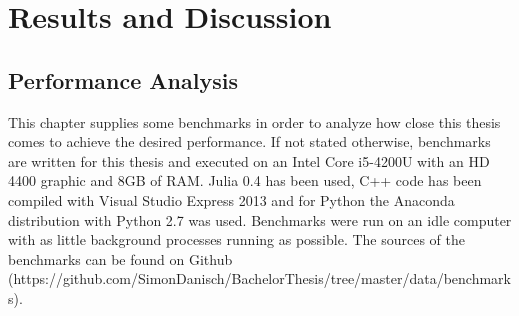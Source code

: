 \section{Results and Discussion}

\subsection{Performance Analysis}
This chapter supplies some benchmarks in order to analyze how close this thesis comes to achieve the desired performance.
If not stated otherwise, benchmarks are written for this thesis and executed on an Intel Core i5-4200U with an HD 4400 graphic and 8GB of RAM.
Julia 0.4 has been used, C++ code has been compiled with Visual Studio Express 2013 and for Python the Anaconda distribution with Python 2.7 was used.
Benchmarks were run on an idle computer with as little background processes running as possible.
The sources of the benchmarks can be found on Github (https://github.com/SimonDanisch/BachelorThesis/tree/master/data/benchmarks).

